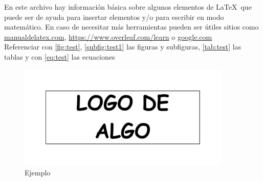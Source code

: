 

En este archivo hay información básica sobre algunos elementos de \LaTeX\, que puede ser de ayuda para insertar elementos y/o para escribir en modo matemático. En caso de necesitar más herramientas pueden ser útiles sitios como \url{manualdelatex.com}, \url{https://www.overleaf.com/learn} o \url{google.com}\\


 Referenciar con \autoref{fig:test}, \autoref{subfig:test1} las figuras y subfiguras, \autoref{tab:test} las tablas y con \eqref{eq:test} las ecuaciones

\begin{figure}[H]
  \centering
   \includegraphics[height = 5cm]{imagenes/logo.png}
   \caption{Ejemplo}
   \label{fig:test}
\end{figure}

